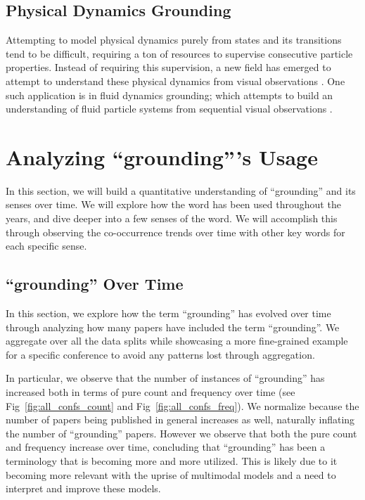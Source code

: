\documentclass[11pt]{article}
\begin{document}
\subsection{Physical Dynamics Grounding}
\label{sec:dynamics}
Attempting to model physical dynamics purely from states and its transitions tend to be difficult, requiring a ton of resources to supervise consecutive particle properties. Instead of requiring this supervision, a new field has emerged to attempt to understand these physical dynamics from visual observations \cite{NEURIPS2024_neuma_material_visual_grounding}. One such application is in fluid dynamics grounding; which attempts to build an understanding of fluid particle systems from sequential visual observations \cite{guan2022neurofluidfluiddynamicsgrounding}. 

\section{Analyzing ``grounding'''s Usage}
In this section, we will build a quantitative understanding of ``grounding'' and its senses over time. We will explore how the word has been used throughout the years, and dive deeper into a few senses of the word. We will accomplish this through observing the co-occurrence trends over time with other key words for each specific sense.

\subsection{``grounding'' Over Time}
In this section, we explore how the term ``grounding'' has evolved over time through analyzing how many papers have included the term ``grounding''. We aggregate over all the data splits while showcasing a more fine-grained example for a specific conference to avoid any patterns lost through aggregation.

In particular, we observe that the number of instances of ``grounding'' has increased both in terms of pure count and frequency over time (see Fig~\ref{fig:all_confs_count} and Fig~\ref{fig:all_confs_freq}). We normalize because the number of papers being published in general increases as well, naturally inflating the number of ``grounding'' papers. However we observe that both the pure count and frequency increase over time, concluding that ``grounding'' has been a terminology that is becoming more and more utilized. This is likely due to it becoming more relevant with the uprise of multimodal models \cite{xiao2024visualgroundingsurvey} and a need to interpret and improve these models.
\end{document}
